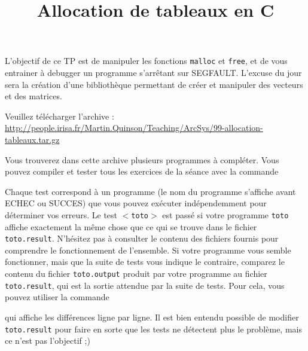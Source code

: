 \documentclass[10pt]{article}\usepackage[enonce]{exemptty}
\title{Allocation de tableaux en C}
\begin{document}
\maketitle

\noindent{}\medskip

L'objectif de ce TP est de manipuler les fonctions \lstinline$malloc$
et \lstinline$free$, et de vous entrainer à debugger un programme
s'arrêtant sur SEGFAULT. L'excuse du jour sera la création d'une
bibliothèque permettant de créer et manipuler des vecteurs et des
matrices.  \bigskip

Veuillez télécharger l'archive :\\
\url{http://people.irisa.fr/Martin.Quinson/Teaching/ArcSys/99-allocation-tableaux.tar.gz}

Vous trouverez dans cette archive plusieurs programmes à compléter. Vous pouvez
compiler et tester tous les exercices de la séance avec la commande 

Chaque test correspond à un programme (le nom du programme s'affiche avant
ECHEC ou SUCCES) que vous pouvez exécuter indépendemment pour déterminer vos
erreurs. Le test \texttt{$<$toto$>$} est passé si votre programme \texttt{toto}
affiche exactement la même chose que ce qui se trouve dans le fichier
\texttt{toto.result}. N'hésitez pas à consulter le contenu des fichiers fournis
pour comprendre le fonctionnement de l'ensemble. Si votre programme vous semble
fonctionner, mais que la suite de tests vous indique le contraire, comparez le
contenu du fichier \texttt{toto.output} produit par votre programme au fichier
\texttt{toto.result}, qui est la sortie attendue par la suite de tests. Pour
cela, vous pouvez utiliser la commande

\noindent{}
qui affiche les différences ligne par ligne. Il est bien entendu possible de
modifier \texttt{toto.result} pour faire en sorte que les tests ne détectent
plus le problème, mais ce n'est pas l'objectif ;)
\end{document}
